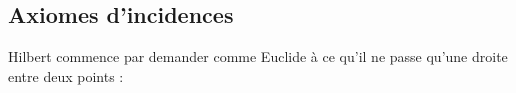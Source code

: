         \subsection{Axiomes d'incidences}\setcounter{serieaxiom}{1}\setcounter{axi}{0}



Hilbert commence par demander comme Euclide à ce qu'il ne passe qu'une droite entre deux points :

